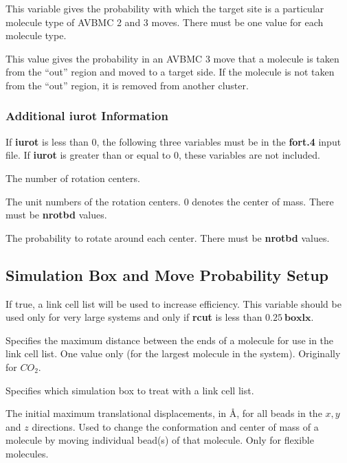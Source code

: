\documentclass[12pt,letterpaper]{article}
\begin{document}
 This variable gives the probability with which the target site 
is a particular molecule type of AVBMC 2 and 3 moves.
There must be one value for each molecule type.

 This value gives the probability in an AVBMC 3 move
that a molecule is taken from the ``out'' region and moved to a target side.  If the molecule is not taken
from the ``out'' region, it is removed from another cluster.

\subsubsection{Additional {\bf iurot} Information}
If {\bf iurot} is less than 0, the following three variables must be in the {\bf fort.4} input file.
If {\bf iurot} is greater than or equal to 0, these variables are not included.

 The number of rotation centers.

 The unit numbers of the rotation centers.  0 denotes the center of mass.
There must be {\bf nrotbd} values.

 The probability to rotate around each center.
There must be {\bf nrotbd} values.

\subsection{Simulation Box and Move Probability Setup}

 If true, a link cell list will be used to increase efficiency.  
This variable should be used only for very large systems and only if 
{\textbf{rcut}} is less than $0.25~{\textbf{boxlx}}$.

 Specifies the maximum distance between the ends of a molecule 
for use in the link cell list.  One value only (for the largest molecule in the system).
Originally for $CO_2$.

 Specifies which simulation box to treat with a
link cell list.

 The initial maximum translational
displacements, in {\AA}, for all beads in the $x, y$ and $z$ directions.
Used to change the conformation and center of mass of a molecule 
by moving individual bead(s) of that molecule.  Only for flexible molecules.
\end{document}
